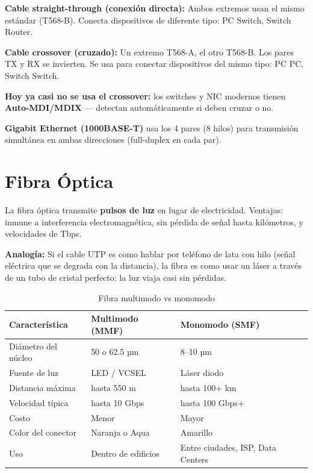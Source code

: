 \begin{ejemplo}
\textbf{Cable straight-through (conexión directa):}
Ambos extremos usan el mismo estándar (T568-B). Conecta dispositivos de
diferente tipo: PC \textrightarrow{} Switch, Switch \textrightarrow{} Router.

\textbf{Cable crossover (cruzado):}
Un extremo T568-A, el otro T568-B. Los pares TX y RX se invierten.
Se usa para conectar dispositivos del mismo tipo: PC \textrightarrow{} PC,
Switch \textrightarrow{} Switch.

 \textbf{Hoy ya casi no se usa el crossover:} los switches
y NIC modernos tienen \textbf{Auto-MDI/MDIX} --- detectan automáticamente
si deben cruzar o no.

\textbf{Gigabit Ethernet (1000BASE-T)} usa los 4 pares (8 hilos) para
transmisión simultánea en ambas direcciones (full-duplex en cada par).
\end{ejemplo}

\section{ Fibra Óptica}

\begin{concepto}
La fibra óptica transmite \textbf{pulsos de luz} en lugar de electricidad.
Ventajas: inmune a interferencia electromagnética, sin pérdida de señal
hasta kilómetros, y velocidades de Tbps.

 \textbf{Analogía:} Si el cable UTP es como hablar por
teléfono de lata con hilo (señal eléctrica que se degrada con la distancia),
la fibra es como usar un láser a través de un tubo de cristal perfecto:
la luz viaja casi sin pérdidas.
\end{concepto}

\begin{table}[h!]
\centering
\renewcommand{\arraystretch}{1.4}
\begin{tabular}{lll}
\toprule
\textbf{Característica} & \textbf{Multimodo (MMF)} & \textbf{Monomodo (SMF)} \\
\midrule
Diámetro del núcleo & 50 o 62.5 µm    & 8--10 µm \\
Fuente de luz       & LED / VCSEL      & Láser diodo \\
Distancia máxima    & hasta 550 m      & hasta 100+ km \\
Velocidad típica    & hasta 10 Gbps    & hasta 100 Gbps+ \\
Costo               & Menor            & Mayor \\
Color del conector  & Naranja o Aqua   & Amarillo \\
Uso                 & Dentro de edificios & Entre ciudades, ISP, Data Centers \\
\bottomrule
\end{tabular}
\caption{Fibra multimodo vs monomodo}
\end{table}


